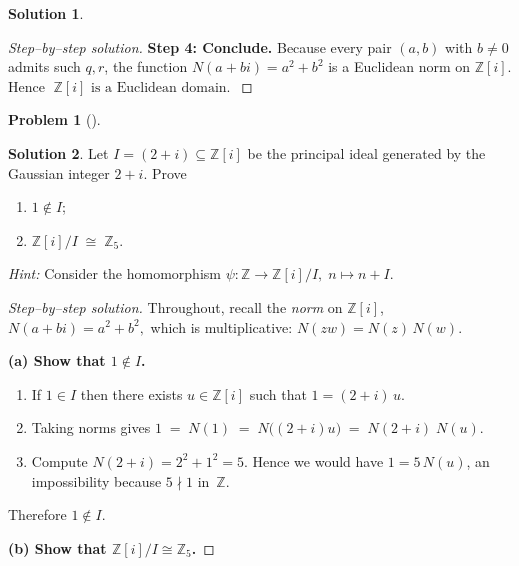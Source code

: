 \documentclass[12pt]{article}
\theoremstyle{definition} %
\newtheorem{solution}{Solution}
\newtheorem{problem}{Problem}
\theoremstyle{plain} %
\begin{document}
\begin{solution}
\begin{proof}[Step–by–step solution]
    \bigskip
    \textbf{Step 4:  Conclude.}\newline
    Because every pair $(a,b)$ with $b\ne 0$ admits such $q,r$, the function
    $N(a+bi)=a^{2}+b^{2}$ is a Euclidean norm on $\mathbb{Z}[i]$.
    Hence $\boxed{\;\mathbb{Z}[i]\text{ is a Euclidean domain.}\;}$
    \end{proof}
\end{solution}
\begin{problem}[]
  
\end{problem}
\begin{solution}
    Let $I=(2+i)\subseteq\mathbb{Z}[i]$ be the principal ideal generated by the
    Gaussian integer $2+i$.  Prove
    
    \begin{enumerate}[label=\textup{(\alph*)}]
      \item $1\notin I$;
      \item $\displaystyle\mathbb{Z}[i]\big/I\;\cong\;\mathbb{Z}_5$.
    \end{enumerate}
    
    \emph{Hint:}  Consider the homomorphism
    $\psi:\mathbb{Z}\longrightarrow\mathbb{Z}[i]/I,\;n\mapsto n+I$.
    
    \begin{proof}[Step--by--step solution]
    Throughout, recall the \emph{norm} on $\mathbb{Z}[i]$,
    \(
      N(a+bi)=a^{2}+b^{2},
    \)
    which is multiplicative: $N(zw)=N(z)\,N(w)$.
    
    \bigskip
    \textbf{(a) Show that $1\notin I$.}
    
    \begin{enumerate}[label=\arabic*.]
      \item If $1\in I$ then there exists $u\in\mathbb{Z}[i]$ such that
            \(
              1=(2+i)\,u.
            \)
      \item Taking norms gives
            \(
              1
              \;=\;
              N(1)
              \;=\;
              N\bigl((2+i)u\bigr)
              \;=\;
              N(2+i)\;N(u).
            \)
      \item Compute $N(2+i)=2^{2}+1^{2}=5$.
            Hence we would have $1=5\,N(u)$, an impossibility because
            $5\nmid 1$ in~$\mathbb{Z}$.
    \end{enumerate}
    Therefore \(1\notin I\).
    
    \bigskip
    \textbf{(b) Show that \(\mathbb{Z}[i]/I\cong\mathbb{Z}_5\).}
    

\end{proof}
\end{solution}
\end{document}
